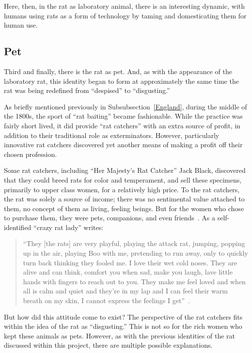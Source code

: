\documentclass[12pt]{article}
\begin{document}
Here, then, in the rat as laboratory animal, there is an interesting dynamic, with humans using rats as a form of technology by taming and domesticating them for human use.

\subsection{Pet} \label{Companionship}

Third and finally, there is the rat as pet. And, as with the appearance of the laboratory rat, this identity began to form at approximately the same time the rat was being redefined from ``despised'' to ``disgusting.''

As briefly mentioned previously in Subsubsection~\ref{England}, during the middle of the 1800s, the sport of ``rat baiting'' became fashionable. While the practice was fairly short lived, it did provide ``rat catchers'' with an extra source of profit, in addition to their traditional role as exterminators. However, particularly innovative rat catchers discovered yet another means of making a profit off their chosen profession.

Some rat catchers, including ``Her Majesty's Rat Catcher'' Jack Black, discovered that they could breed rats for color and temperament, and sell these specimens, primarily to upper class women, for a relatively high price. To the rat catchers, the rat was solely a source of income; there was no sentimental value attached to them, no concept of them as living, feeling beings. But for the women who chose to purchase them, they were pets, companions, and even friends~\cite{Edelman2002, Edelman2005}. As a self-identified ``crazy rat lady'' writes:

\begin{quote}
``They [the rats] are very playful, playing the attack rat, jumping, popping up in the air, playing Boo with me, pretending to run away, only to quickly turn back thinking they fooled me. I love their wet cold noses. They are alive and can think, comfort you when sad, make you laugh, lave little hands with fingers to reach out to you. They make me feel loved and when all is calm and quiet and they're in my lap and I can feel their warm breath on my skin, I cannot express the feelings I get''~\cite{Edelman2005}.
\end{quote}

But how did this attitude come to exist? The perspective of the rat catchers fits within the idea of the rat as ``disgusting.'' This is not so for the rich women who kept these animals as pets. However, as with the previous identities of the rat discussed within this project, there are multiple possible explanations.
\end{document}
